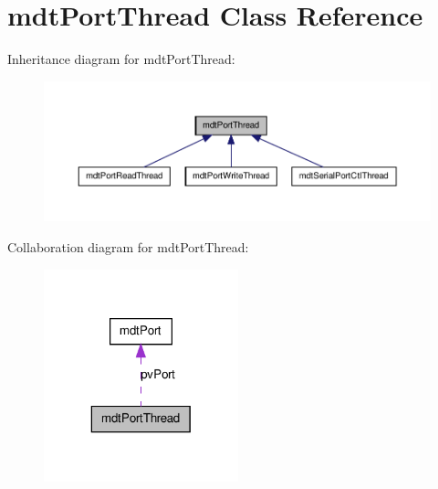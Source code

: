 \hypertarget{classmdt_port_thread}{
\section{mdtPortThread Class Reference}
\label{classmdt_port_thread}
}


Inheritance diagram for mdtPortThread:\nopagebreak
\begin{figure}[H]
\begin{center}
\leavevmode
\includegraphics[width=400pt]{classmdt_port_thread__inherit__graph}
\end{center}
\end{figure}


Collaboration diagram for mdtPortThread:\nopagebreak
\begin{figure}[H]
\begin{center}
\leavevmode
\includegraphics[width=160pt]{classmdt_port_thread__coll__graph}
\end{center}
\end{figure}
